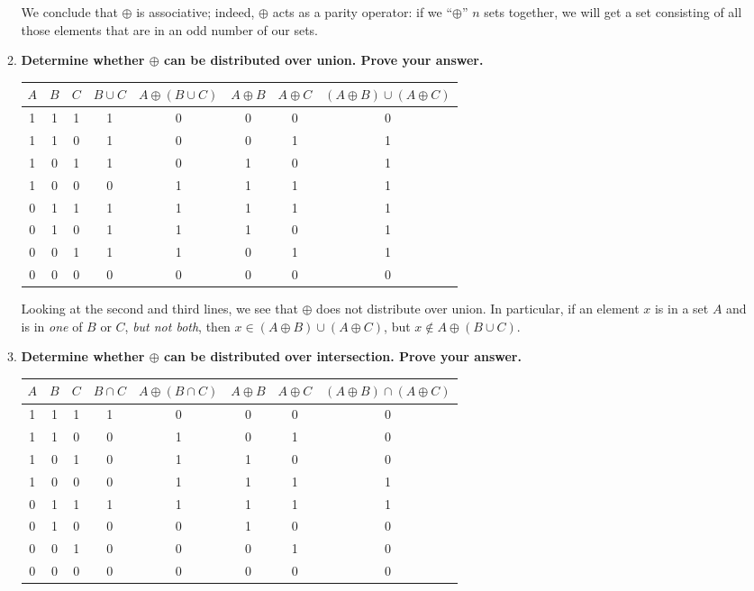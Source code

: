 \documentclass[12pt]{amsart}
\begin{document}
\begin{enumerate}
\begin{enumerate}
We conclude that $\oplus$ is associative; indeed, $\oplus$ acts as a
parity operator: if we ``$\oplus$'' $n$ sets together, we will get a
set consisting of all those elements that are in an odd number of our
sets.


\item {\bf Determine whether $\oplus$ can be distributed over union.  Prove your answer.}

\begin{tabular}{|c|c|c|c|c|c|c|c|}
\hline
$A$ & $B$ & $C$ & $B \cup C$ & $A \oplus (B \cup C)$ & $A \oplus B$ & $A \oplus C$ & $(A \oplus B) \cup (A \oplus C)$ \\
\hline
1 & 1 & 1 & 1 & 0 & 0 & 0 & 0 \\
1 & 1 & 0 & 1 & 0 & 0 & 1 & 1 \\
1 & 0 & 1 & 1 & 0 & 1 & 0 & 1 \\
1 & 0 & 0 & 0 & 1 & 1 & 1 & 1 \\
0 & 1 & 1 & 1 & 1 & 1 & 1 & 1 \\
0 & 1 & 0 & 1 & 1 & 1 & 0 & 1 \\
0 & 0 & 1 & 1 & 1 & 0 & 1 & 1 \\
0 & 0 & 0 & 0 & 0 & 0 & 0 & 0 \\
\hline
\end{tabular}

Looking at the second and third lines, we see that $\oplus$ does not
distribute over union.  In particular, if an element $x$ is in a set
$A$ and is in {\em one} of $B$ or $C$, {\em but not both}, then $x \in
(A \oplus B) \cup (A \oplus C)$, but $x \notin A \oplus (B \cup C)$.

\item {\bf Determine whether $\oplus$ can be distributed over intersection.  Prove your answer.}

\begin{tabular}{|c|c|c|c|c|c|c|c|}
\hline
$A$ & $B$ & $C$ & $B \cap C$ & $A \oplus (B \cap C)$ & $A \oplus B$ & $A \oplus C$ & $(A \oplus B) \cap (A \oplus C)$ \\
\hline
1 & 1 & 1 & 1 & 0 & 0 & 0 & 0 \\
1 & 1 & 0 & 0 & 1 & 0 & 1 & 0 \\
1 & 0 & 1 & 0 & 1 & 1 & 0 & 0 \\
1 & 0 & 0 & 0 & 1 & 1 & 1 & 1 \\
0 & 1 & 1 & 1 & 1 & 1 & 1 & 1 \\
0 & 1 & 0 & 0 & 0 & 1 & 0 & 0 \\
0 & 0 & 1 & 0 & 0 & 0 & 1 & 0 \\
0 & 0 & 0 & 0 & 0 & 0 & 0 & 0 \\
\hline
\end{tabular}


\end{enumerate}
\end{enumerate}
\end{document}
